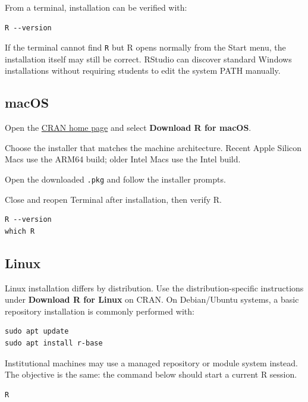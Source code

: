 From a terminal, installation can be verified with:

\begin{lstlisting}[style=utpterminal]
R --version
\end{lstlisting}

If the terminal cannot find \texttt{R} but R opens normally from the Start menu, the installation itself may still be correct. RStudio can discover standard Windows installations without requiring students to edit the system PATH manually.

\subsection{macOS}

\begin{utpsteps}
  \item Open the \href{https://cran.r-project.org/}{CRAN home page} and select \textbf{Download R for macOS}.
  \item Choose the installer that matches the machine architecture. Recent Apple Silicon Macs use the ARM64 build; older Intel Macs use the Intel build.
  \item Open the downloaded \texttt{.pkg} and follow the installer prompts.
  \item Close and reopen Terminal after installation, then verify R.
\end{utpsteps}

\begin{lstlisting}[style=utpterminal]
R --version
which R
\end{lstlisting}

\subsection{Linux}

Linux installation differs by distribution. Use the distribution-specific instructions under \textbf{Download R for Linux} on CRAN. On Debian/Ubuntu systems, a basic repository installation is commonly performed with:

\begin{lstlisting}[style=utpterminal]
sudo apt update
sudo apt install r-base
\end{lstlisting}

Institutional machines may use a managed repository or module system instead. The objective is the same: the command below should start a current R session.

\begin{lstlisting}[style=utpterminal]
R
\end{lstlisting}

